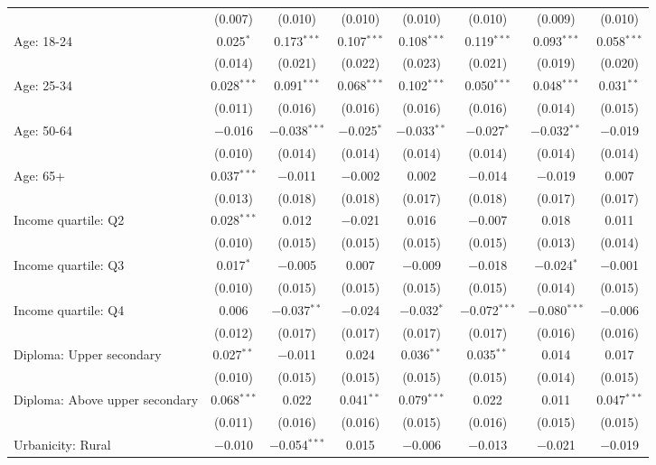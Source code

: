 \begin{tabular}{@{\extracolsep{5pt}}lccccccc}
  & (0.007) & (0.010) & (0.010) & (0.010) & (0.010) & (0.009) & (0.010) \\ 
  Age: 18\mbox{-}24 & 0.025$^{*}$ & 0.173$^{***}$ & 0.107$^{***}$ & 0.108$^{***}$ & 0.119$^{***}$ & 0.093$^{***}$ & 0.058$^{***}$ \\ 
  & (0.014) & (0.021) & (0.022) & (0.023) & (0.021) & (0.019) & (0.020) \\ 
  Age: 25\mbox{-}34 & 0.028$^{***}$ & 0.091$^{***}$ & 0.068$^{***}$ & 0.102$^{***}$ & 0.050$^{***}$ & 0.048$^{***}$ & 0.031$^{**}$ \\ 
  & (0.011) & (0.016) & (0.016) & (0.016) & (0.016) & (0.014) & (0.015) \\ 
  Age: 50\mbox{-}64 & $-$0.016 & $-$0.038$^{***}$ & $-$0.025$^{*}$ & $-$0.033$^{**}$ & $-$0.027$^{*}$ & $-$0.032$^{**}$ & $-$0.019 \\ 
  & (0.010) & (0.014) & (0.014) & (0.014) & (0.014) & (0.014) & (0.014) \\ 
  Age: 65+ & 0.037$^{***}$ & $-$0.011 & $-$0.002 & 0.002 & $-$0.014 & $-$0.019 & 0.007 \\ 
  & (0.013) & (0.018) & (0.018) & (0.017) & (0.018) & (0.017) & (0.017) \\ 
  Income quartile: Q2 & 0.028$^{***}$ & 0.012 & $-$0.021 & 0.016 & $-$0.007 & 0.018 & 0.011 \\ 
  & (0.010) & (0.015) & (0.015) & (0.015) & (0.015) & (0.013) & (0.014) \\ 
  Income quartile: Q3 & 0.017$^{*}$ & $-$0.005 & 0.007 & $-$0.009 & $-$0.018 & $-$0.024$^{*}$ & $-$0.001 \\ 
  & (0.010) & (0.015) & (0.015) & (0.015) & (0.015) & (0.014) & (0.015) \\ 
  Income quartile: Q4 & 0.006 & $-$0.037$^{**}$ & $-$0.024 & $-$0.032$^{*}$ & $-$0.072$^{***}$ & $-$0.080$^{***}$ & $-$0.006 \\ 
  & (0.012) & (0.017) & (0.017) & (0.017) & (0.017) & (0.016) & (0.016) \\ 
  Diploma: Upper secondary & 0.027$^{**}$ & $-$0.011 & 0.024 & 0.036$^{**}$ & 0.035$^{**}$ & 0.014 & 0.017 \\ 
  & (0.010) & (0.015) & (0.015) & (0.015) & (0.015) & (0.014) & (0.015) \\ 
  Diploma: Above upper secondary & 0.068$^{***}$ & 0.022 & 0.041$^{**}$ & 0.079$^{***}$ & 0.022 & 0.011 & 0.047$^{***}$ \\ 
  & (0.011) & (0.016) & (0.016) & (0.015) & (0.016) & (0.015) & (0.015) \\ 
  Urbanicity: Rural & $-$0.010 & $-$0.054$^{***}$ & 0.015 & $-$0.006 & $-$0.013 & $-$0.021 & $-$0.019 \\ 

\end{tabular}
